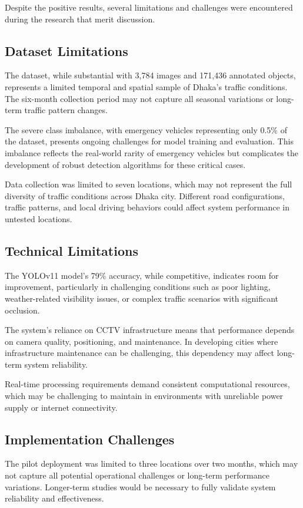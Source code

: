 Despite the positive results, several limitations and challenges were encountered during the research that merit discussion.

\subsection{Dataset Limitations}
The dataset, while substantial with 3,784 images and 171,436 annotated objects, represents a limited temporal and spatial sample of Dhaka's traffic conditions. The six-month collection period may not capture all seasonal variations or long-term traffic pattern changes.

The severe class imbalance, with emergency vehicles representing only 0.5\% of the dataset, presents ongoing challenges for model training and evaluation. This imbalance reflects the real-world rarity of emergency vehicles but complicates the development of robust detection algorithms for these critical cases.

Data collection was limited to seven locations, which may not represent the full diversity of traffic conditions across Dhaka city. Different road configurations, traffic patterns, and local driving behaviors could affect system performance in untested locations.

\subsection{Technical Limitations}
The YOLOv11 model's 79\% accuracy, while competitive, indicates room for improvement, particularly in challenging conditions such as poor lighting, weather-related visibility issues, or complex traffic scenarios with significant occlusion.

The system's reliance on CCTV infrastructure means that performance depends on camera quality, positioning, and maintenance. In developing cities where infrastructure maintenance can be challenging, this dependency may affect long-term system reliability.

Real-time processing requirements demand consistent computational resources, which may be challenging to maintain in environments with unreliable power supply or internet connectivity.

\subsection{Implementation Challenges}
The pilot deployment was limited to three locations over two months, which may not capture all potential operational challenges or long-term performance variations. Longer-term studies would be necessary to fully validate system reliability and effectiveness.

